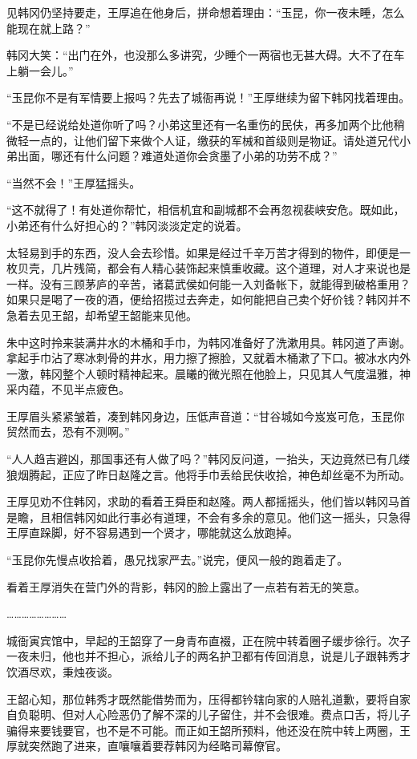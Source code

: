见韩冈仍坚持要走，王厚追在他身后，拼命想着理由：“玉昆，你一夜未睡，怎么能现在就上路？”

韩冈大笑：“出门在外，也没那么多讲究，少睡个一两宿也无甚大碍。大不了在车上躺一会儿。”

“玉昆你不是有军情要上报吗？先去了城衙再说！”王厚继续为留下韩冈找着理由。

“不是已经说给处道你听了吗？小弟这里还有一名重伤的民伕，再多加两个比他稍微轻一点的，让他们留下来做个人证，缴获的军械和首级则是物证。请处道兄代小弟出面，哪还有什么问题？难道处道你会贪墨了小弟的功劳不成？”

“当然不会！”王厚猛摇头。

“这不就得了！有处道你帮忙，相信机宜和副城都不会再忽视裴峡安危。既如此，小弟还有什么好担心的？”韩冈淡淡定定的说着。

太轻易到手的东西，没人会去珍惜。如果是经过千辛万苦才得到的物件，即便是一枚贝壳，几片残简，都会有人精心装饰起来慎重收藏。这个道理，对人才来说也是一样。没有三顾茅庐的辛苦，诸葛武侯如何能一入刘备帐下，就能得到破格重用？如果只是喝了一夜的酒，便给招揽过去奔走，如何能把自己卖个好价钱？韩冈并不急着去见王韶，却希望王韶能来见他。

朱中这时拎来装满井水的木桶和手巾，为韩冈准备好了洗漱用具。韩冈道了声谢。拿起手巾沾了寒冰刺骨的井水，用力擦了擦脸，又就着木桶漱了下口。被冰水内外一激，韩冈整个人顿时精神起来。晨曦的微光照在他脸上，只见其人气度温雅，神采内蕴，不见半点疲色。

王厚眉头紧紧皱着，凑到韩冈身边，压低声音道：“甘谷城如今岌岌可危，玉昆你贸然而去，恐有不测啊。”

“人人趋吉避凶，那国事还有人做了吗？”韩冈反问道，一抬头，天边竟然已有几缕狼烟腾起，正应了昨日赵隆之言。他将手巾丢给民伕收拾，神色却丝毫不为所动。

王厚见劝不住韩冈，求助的看着王舜臣和赵隆。两人都摇摇头，他们皆以韩冈马首是瞻，且相信韩冈如此行事必有道理，不会有多余的意见。他们这一摇头，只急得王厚直跺脚，好不容易遇到一个贤才，哪能就这么放跑掉。

“玉昆你先慢点收拾着，愚兄找家严去。”说完，便风一般的跑着走了。

看着王厚消失在营门外的背影，韩冈的脸上露出了一点若有若无的笑意。

……………………

城衙寅宾馆中，早起的王韶穿了一身青布直裰，正在院中转着圈子缓步徐行。次子一夜未归，他也并不担心，派给儿子的两名护卫都有传回消息，说是儿子跟韩秀才饮酒尽欢，秉烛夜谈。

王韶心知，那位韩秀才既然能借势而为，压得都钤辖向家的人赔礼道歉，要将自家自负聪明、但对人心险恶仍了解不深的儿子留住，并不会很难。费点口舌，将儿子骗得来要钱要官，也不是不可能。而正如王韶所预料，他还没在院中转上两圈，王厚就突然跑了进来，直嚷嚷着要荐韩冈为经略司幕僚官。

